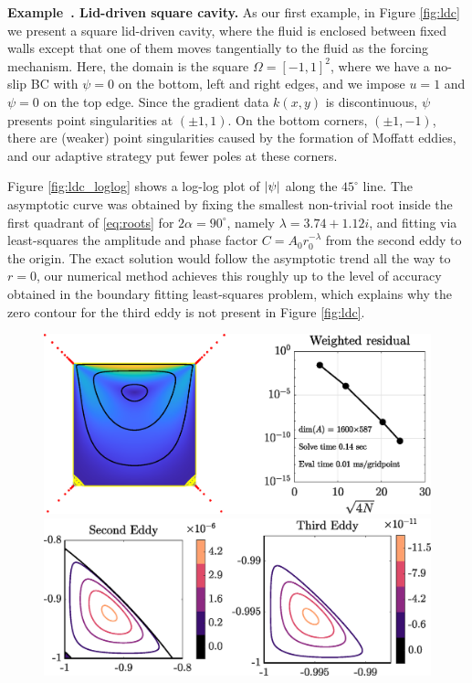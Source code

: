 \documentclass{article}
\newcounter{example}[section]
\newenvironment{example}[1][]{\refstepcounter{example}\par\medskip
	\textbf{Example~\theexample. #1} \rmfamily}{\medskip}
\begin{document}
\begin{example}[Lid-driven square cavity.]
\label{ex:square}
As our first example, in Figure \ref{fig:ldc} we present a square lid-driven
cavity, where the fluid is enclosed between fixed walls except that one of
them moves tangentially to the fluid as the forcing mechanism. Here, the
domain is the square $\Omega=[-1,1]^2$, where we have a no-slip BC with
$\psi=0$ on the bottom, left and right edges, and we impose $u=1$ and
$\psi=0$ on the top edge. Since the gradient data $k(x,y)$ is discontinuous,
$\psi$ presents point singularities at $(\pm 1, 1)$. On the bottom corners,
$(\pm 1,-1)$, there are (weaker) point singularities caused by the formation
of Moffatt eddies, and our adaptive strategy put fewer poles at these
corners.

Figure \ref{fig:ldc_loglog} shows a log-log plot of $\abs{\psi}$ along the
$45^\circ$ line. The asymptotic curve was obtained by fixing the smallest
non-trivial root inside the first quadrant of \eqref{eq:roots} for
$2\alpha=90^\circ$, namely $\lambda=3.74 + 1.12i$, and fitting via
least-squares the amplitude and phase factor $C = A_0 r_0^{-\lambda}$ from
the second eddy to the origin.  The exact solution would follow the
asymptotic trend all the way to $r=0$, our numerical method achieves this
roughly up to the level of accuracy obtained in the boundary fitting
least-squares problem, which explains why the zero contour for the third
eddy is not present in Figure \ref{fig:ldc}. 
\begin{figure}[H]
\centering
\includegraphics[width=\linewidth]{Figures/ldc}

\vspace{2em}
\includegraphics[width=\linewidth]{Figures/ldc_eddy}


\end{figure}
\end{example}
\end{document}
